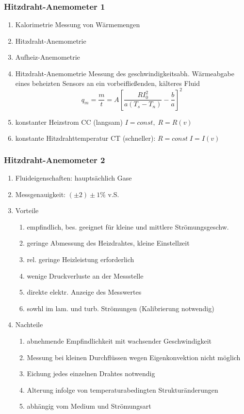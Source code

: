 \documentclass[a4paper]{scrartcl}
\begin{document}
\subsubsection{Hitzdraht-Anemometer 1}
\begin{enumerate}
\item Kalorimetrie Messung von Wärmemengen
\item Hitzdraht-Anemometrie
\item Aufheiz-Anemometrie
\item Hitzdraht-Anemometrie
Messung des geschwindigkeitsabh. Wärmeabgabe eines beheizten Sensors an ein vorbeifließenden, kälteres Fluid
\[ q_m = \frac{m}{t} = A \left [ \frac{R I_0^2}{a (T_s - T_n)} - \frac{b}{a} \right ]^2\]
\item konstanter Heizstrom CC (langsam) $I = const, \; R=R(v)$
\item konstante Hitzdrahttemperatur CT (schneller): $R= const \; I = I(v)$
\end{enumerate}

\subsubsection{Hitzdraht-Anemometer 2}
\begin{enumerate}
\item Fluideigenschaften: hauptsächlich Gase
\item Messgenauigkeit: $(\pm 2) \pm 1 \%$ v.S.
\item Vorteile
    \begin{enumerate}
    \item empfindlich, bes. geeignet für kleine und mittlere Strömungsgeschw.
    \item geringe Abmessung des Heizdrahtes, kleine Einstellzeit
    \item rel. geringe Heizleistung erforderlich
    \item wenige Druckverluste an der Messstelle
    \item direkte elektr. Anzeige des Messwertes
    \item sowhl im lam. und turb. Strömungen (Kalibrierung notwendig)
    \end{enumerate}
\item Nachteile
    \begin{enumerate}
    \item abnehmende Empfindlichkeit mit wachsender Geschwindigkeit
    \item Messung bei kleinen Durchflüssen wegen Eigenkonvektion nicht möglich
    \item Eichung jedes einzelnen Drahtes notwendig
    \item Alterung infolge von temperaturabedingten Strukturänderungen
    \item abhängig vom Medium und Strömungsart
    \end{enumerate}

\end{enumerate}
\end{document}
